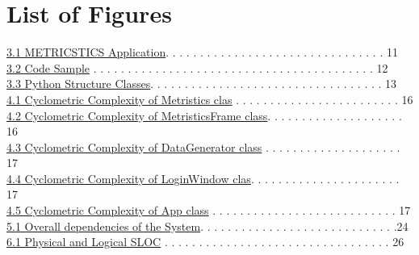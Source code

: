 \documentclass[11pt]{article}
\begin{document}
\section*{List of Figures}
\normalsize{
\raggedright{
\hyperref[sec: Use Case Diagram]{3.1 METRICSTICS Application}. . . . . . . . . . . . . . . .  . . . . . . . . .  . . . . . . . 11 \\
\hyperref[sec: Use Case Diagram]{3.2 Code Sample} . . . . . . . . . . . . . . . . . . . . . . . . .  . . . . . . . . .  . . . . . . . 12 \\
\hyperref[sec: Use Case Diagram]{3.3 Python Structure Classes}. . . . . . . . . . . . . . . . . .  . . . . . . . . .  . . . . . . . 13 \\
\hyperref[sec: Use Case Diagram]{4.1 Cyclometric Complexity of Metristics clas} . . . . . . . .  . . . . . . . . . . . . . . . . 16\\
\hyperref[sec: Use Case Diagram]{4.2 Cyclometric Complexity of MetristicsFrame class}. . . .  . . . . . . . . .  . . . . . . . 16\\
\hyperref[sec: Use Case Diagram]{4.3 Cyclometric Complexity of DataGenerator class} . . . . . . . .  . . . . . . . . .  . . . 17\\
\hyperref[sec: Use Case Diagram]{4.4 Cyclometric Complexity of LoginWindow clas}. . . . . . . . . . . . . . .  . . . . . . . 17\\
\hyperref[sec: Use Case Diagram]{4.5 Cyclometric Complexity of App class} . . . . . . . . . . . . . . . . . . . . .  . . . . . . 17\\
\hyperref[sec: Use Case Diagram]{5.1 Overall dependencies of the System}. . . . . . . . . . . .  . . . . . . . . .  . . . . . . . .24\\
\hyperref[sec: Use Case Diagram]{6.1 Physical and Logical SLOC} . . . . . . . . . . . . . . . . . . . . . . . . . . .  . . . . . . 26\\
}}

\pagebreak
\end{document}
